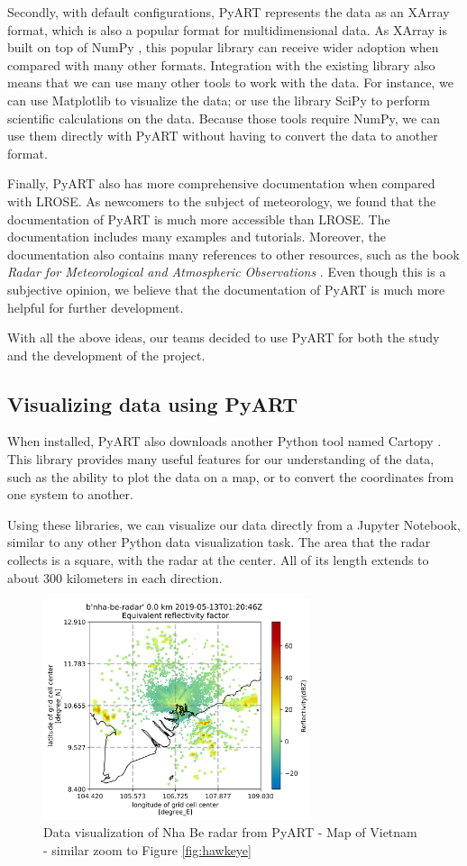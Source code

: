 Secondly, with default configurations, PyART represents the data as an XArray
\cite{hoyer2017xarray} format, which is also a popular format for
multidimensional data. As XArray is built on top of NumPy
\cite{harris2020array}, this popular library can receive wider adoption when
compared with many other formats. Integration with the existing library also
means that we can use many other tools to work with the data. For instance, we
can use Matplotlib to visualize the data; or use the library SciPy
\cite{2020SciPy-NMeth} to perform scientific calculations on the data. Because
those tools require NumPy, we can use them directly with PyART without having to
convert the data to another format.

Finally, PyART also has more comprehensive documentation when compared with
LROSE. As newcomers to the subject of meteorology, we found that the
documentation of PyART is much more accessible than LROSE. The documentation
includes many examples and tutorials. Moreover, the documentation also contains
many references to other resources, such as the book \textit{Radar for
Meteorological and Atmospheric Observations} \cite{2022Weather}. Even though
this is a subjective opinion, we believe that the documentation of PyART is much
more helpful for further development.

With all the above ideas, our teams decided to use PyART for both the study and
the development of the project.

\subsection{Visualizing data using PyART}
When installed, PyART also downloads another Python tool named Cartopy
\cite{Cartopy}. This library provides many useful features for our understanding
of the data, such as the ability to plot the data on a map, or to convert the
coordinates from one system to another.

Using these libraries, we can visualize our data directly from a Jupyter
Notebook, similar to any other Python data visualization task. The area that the
radar collects is a square, with the radar at the center. All of its length
extends to about 300 kilometers in each direction.

\begin{figure}[H]
  \centering
  \includegraphics[width=0.7\textwidth]{Images/3.1-201905130120.DBZ-pyart.png}
  \vspace{2em}
  \caption{Data visualization of Nha Be radar from PyART - Map of Vietnam -
  similar zoom to Figure \ref{fig:hawkeye}}
  \label{fig:nha-be-viz-far}
\end{figure}

